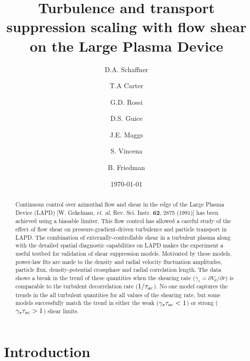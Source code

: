 \documentclass[aip,pop,amsmath,amssymb,preprint,superscriptaddress]{revtex4-1} %
\begin{document}
\title{Turbulence and transport suppression scaling with flow shear on the Large Plasma Device}
\author{D.A. Schaffner}
\author{T.A Carter}
\author{G.D. Rossi}
\author{D.S. Guice}
\author{J.E. Maggs}
\author{S. Vincena}
\author{B. Friedman}
\date{\today}
\begin{abstract}
Continuous control over azimuthal flow and shear in the edge of the
Large Plasma Device (LAPD) [W. Gekelman, \textit{et. al},
  Rev. Sci. Instr. \textbf{62}, 2875 (1991)] has been achieved using a
biasable limiter.  This flow control has allowed a careful study of
the effect of flow shear on pressure-gradient-driven turbulence and
particle transport in LAPD. The combination of externally-controllable
shear in a turbulent plasma along with the detailed spatial diagnostic
capabilities on LAPD makes the experiment a useful testbed for
validation of shear suppression models. Motivated by these models,
power-law fits are made to the density and radial velocity fluctuation
amplitudes, particle flux, density-potential crossphase and radial
correlation length.  The data shows a break in the trend of these
quantities  when the shearing rate ($\gamma_s = \partial
V_\theta/\partial r$) is comparable to the turbulent decorrelation
rate ($1/\tau_{\rm ac}$).  No one model captures the trends in the
all turbulent quantities for all values of  the shearing rate, but
some models successfully match the trend in either the weak
($\gamma_s \tau_{\rm ac} < 1$) or strong ($\gamma_s \tau_{\rm ac} >
1$) shear limits. 
\end{abstract}
\maketitle

\section{Introduction}
\end{document}
